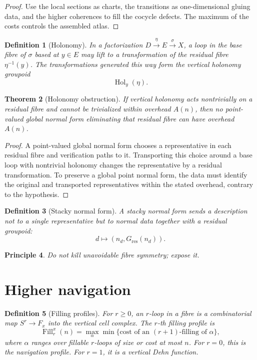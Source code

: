 \documentclass[11pt]{article}
\newtheorem{theorem}{Theorem}[section]
\newtheorem{definition}[theorem]{Definition}
\newtheorem{principle}[theorem]{Principle}
\DeclareMathOperator{\Fill}{Fill}
\DeclareMathOperator{\Hol}{Hol}
\begin{document}
\begin{proof}
Use the local sections as charts, the transitions as one-dimensional gluing data, and the higher coherences to fill the cocycle defects.  The maximum of the costs controls the assembled atlas.
\end{proof}

\begin{definition}[Holonomy]
In a factorization \(D\xrightarrow{\eta}E\xrightarrow{\sigma}X\), a loop in the base fibre of \(\sigma\) based at \(y\in E\) may lift to a transformation of the residual fibre \(\eta^{-1}(y)\).  The transformations generated this way form the vertical holonomy groupoid
\[
\Hol_y(\eta).
\]
\end{definition}

\begin{theorem}[Holonomy obstruction]
If vertical holonomy acts nontrivially on a residual fibre and cannot be trivialized within overhead \(A(n)\), then no point-valued global normal form eliminating that residual fibre can have overhead \(A(n)\).
\end{theorem}

\begin{proof}
A point-valued global normal form chooses a representative in each residual fibre and verification paths to it.  Transporting this choice around a base loop with nontrivial holonomy changes the representative by a residual transformation.  To preserve a global point normal form, the data must identify the original and transported representatives within the stated overhead, contrary to the hypothesis.
\end{proof}

\begin{definition}[Stacky normal form]
A stacky normal form sends a description not to a single representative but to normal data together with a residual groupoid:
\[
d\longmapsto (n_d,G_{\mathrm{res}}(n_d)).
\]
\end{definition}

\begin{principle}
Do not kill unavoidable fibre symmetry; expose it.
\end{principle}

\section{Higher navigation}

\begin{definition}[Filling profiles]
For \(r\ge0\), an \(r\)-loop in a fibre is a combinatorial map \(S^r\to F_x\) into the vertical cell complex.  The \(r\)-th filling profile is
\[
\Fill_r^x(n)=
\max_{\alpha}\min\{\text{cost of an }(r+1)\text{-filling of }\alpha\},
\]
where \(\alpha\) ranges over fillable \(r\)-loops of size or cost at most \(n\).  For \(r=0\), this is the navigation profile.  For \(r=1\), it is a vertical Dehn function.
\end{definition}
\end{document}
